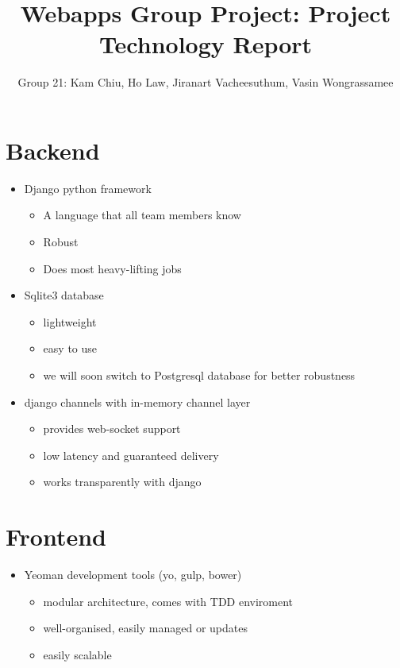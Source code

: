 \documentclass[11pt]{article}
\begin{document}
\title{Webapps Group Project: Project Technology Report}
\author{Group 21: Kam Chiu, Ho Law, Jiranart Vacheesuthum, Vasin Wongrassamee}

\maketitle

\section{Backend}
\begin{itemize}
\item Django python framework
\begin{itemize}
\item A language that all team members know
\item Robust
\item Does most heavy-lifting jobs 
\end{itemize}
\item Sqlite3 database
\begin{itemize}
\item lightweight
\item easy to use
\item we will soon switch to Postgresql database for better robustness
\end{itemize}
\end{itemize}
\begin{itemize}
\item django channels with in-memory channel layer 
\begin{itemize}
\item provides web-socket support
\item low latency and guaranteed delivery
\item works transparently with django
\end{itemize}
\end{itemize}

\section{Frontend}
\begin{itemize}
\item Yeoman development tools (yo, gulp, bower)
\begin{itemize}
\item modular architecture, comes with TDD enviroment
\item well-organised, easily managed or updates
\item easily scalable 
\end{itemize}
\end{itemize}
\end{document}
